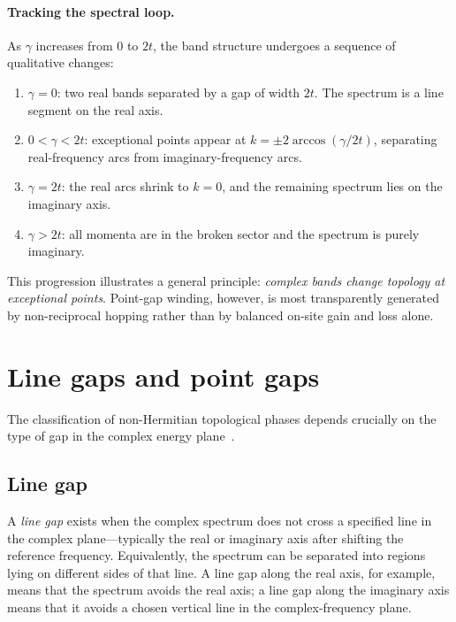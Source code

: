 \paragraph{Tracking the spectral loop.}
As $\gamma$ increases from $0$ to $2t$, the band structure undergoes a
sequence of qualitative changes:
\begin{enumerate}
 \item $\gamma = 0$: two real bands separated by a gap of width $2t$.
 The spectrum is a line segment on the real axis.
 \item $0 < \gamma < 2t$: exceptional points appear at
 $k=\pm 2\arccos(\gamma/2t)$, separating real-frequency arcs from
 imaginary-frequency arcs.
 \item $\gamma = 2t$: the real arcs shrink to $k=0$, and the remaining
 spectrum lies on the imaginary axis.
 \item $\gamma > 2t$: all momenta are in the broken sector and the
 spectrum is purely imaginary.
\end{enumerate}
This progression illustrates a general principle: \emph{complex bands
change topology at exceptional points}. Point-gap winding, however, is
most transparently generated by non-reciprocal hopping rather than by
balanced on-site gain and loss alone.


\section{Line gaps and point gaps}
\label{sec:gap-types}

The classification of non-Hermitian topological phases depends crucially
on the type of gap in the complex energy
plane~\cite{kawabata2019symmetry}.

\subsection{Line gap}
\label{ssec:line-gap}

A \emph{line gap} exists when the complex spectrum does not cross a
specified line in the complex plane---typically the real or imaginary
axis after shifting the reference frequency. Equivalently, the spectrum
can be separated into regions lying on different sides of that line. A
line gap along the real axis, for example, means that the spectrum avoids
the real axis; a line gap along the imaginary axis means that it avoids a
chosen vertical line in the complex-frequency plane.

